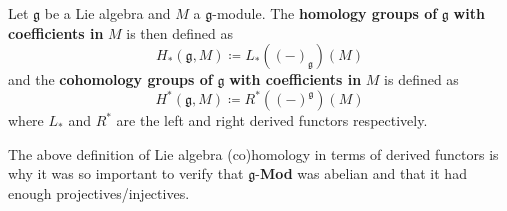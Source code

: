 \begin{definition}
  Let $ \mathfrak{g} $ be a Lie algebra and $ M $ a $ \mathfrak{g} $-module. The \textbf{homology groups of} $ \mathfrak{g} $ \textbf{with coefficients in} $ M $ is then defined as
  \begin{equation}
    H_*(\mathfrak{g}, M) \coloneqq L_*((-)_\mathfrak{g})(M)
  \end{equation}
  and the \textbf{cohomology groups of} $ \mathfrak{g} $ \textbf{with coefficients in} $ M $ is defined as
  \begin{equation}
    H^*(\mathfrak{g}, M) \coloneqq R^*((-)^\mathfrak{g})(M)
    \label{eq:cohomology}
  \end{equation}
  where $ L_* $ and $ R^* $ are the left and right derived functors respectively.
\end{definition}
The above definition of Lie algebra (co)homology in terms of derived functors is why it was so important to verify that $ \mathfrak{g} $-\textbf{Mod} was abelian and that it had enough projectives/injectives.

